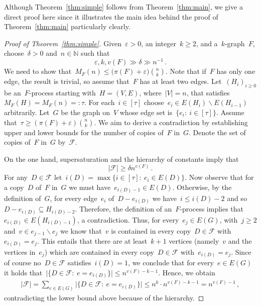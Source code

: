 \documentclass[reqno, 12pt]{amsart}
\numberwithin{equation}{section}
\numberwithin{figure}{section}
\let\setminus=\smallsetminus
\newcommand{\cF}{\mathcal{F}}
\theoremstyle{plain}
\theoremstyle{note}
\theoremstyle{remark}
\begin{document}
        Although Theorem~\ref{thm:simple} follows from Theorem~\ref{thm:main}, we give a direct proof here since it illustrates the main idea behind the proof of Theorem~\ref{thm:main} particularly clearly.
        \begin{proof}[Proof of Theorem~\ref{thm:simple}]
            Given~$\varepsilon>0$, an integer~$k\geq2$, and a~$k$-graph~$F$, choose~$\delta>0$ and~$n\in\mathds{N}$ such that $$\varepsilon,k,v(F)\gg\delta\gg n^{-1}\,.$$
            We need to show that~$M_F(n)\leq\big(\pi(F)+\varepsilon\big)\binom{n}{k}$.
            Note that if~$F$ has only one edge, the result is trivial, so assume that~$F$ has at least two edges.
            Let~$(H_i)_{i\geq0}$ be an~$F$-process starting with~$H=(V,E)$, where~$\vert V\vert=n$, that satisfies~$M_F(H)= M_F(n)=:\tau$.
            For each~$i\in[\tau]$ choose~$e_i\in E(H_i)\setminus E(H_{i-1})$ arbitrarily.
            Let~$G$ be the graph on~$V$ whose edge set is~$\{e_i:\:i\in[\tau]\}$.
            Assume that~$\tau\geq(\pi(F)+\varepsilon)\binom{n}{k}$.
            We aim to derive a contradiction by establishing upper and lower bounds for the number of copies of~$F$ in~$G$.
            Denote the set of copies of~$F$ in~$G$ by~$\cF$.
            
            On the one hand, supersaturation and the hierarchy of constants imply that $$\vert\cF\vert\geq\delta n^{v(F)}\,.$$
            For any~$D\in\cF$ let~$i(D)=\max\{i\in[\tau]:\:e_i\in E(D)\}$.
            Now observe that for a copy~$D$ of~$F$ in~$G$ we must have~$e_{i(D)-1}\in E(D)$.
            Otherwise, by the definition of~$G$, for every edge~$e_i$ of~$D-e_{i(D)}$ we have~$i\leq i(D)-2$ and so~$D-e_{i(D)}\subseteq H_{i(D)-2}$.
            Therefore, the definition of an~$F$-process implies that~$e_{i(D)}\in E(H_{i(D)-1})$, a contradiction.
            Thus, for every~$e_j\in E(G)$, with~$j\geq2$ and~$v\in e_{j-1}\setminus e_j$ we know that~$v$ is contained in every copy~$D\in\cF$ with~$e_{i(D)}=e_j$.
            This entails that there are at least~$k+1$ vertices (namely~$v$ and the vertices in~$e_j$) which are contained in every copy~$D\in\cF$ with~$e_{i(D)}=e_j$.
            Since of course no~$D\in\cF$ satisfies~$i(D)=1$, we conclude that for every~$e\in E(G)$ it holds that~$\vert\{D\in\cF:\:e=e_{i(D)}\}\vert\leq n^{v(F)-k-1}$.
            Hence, we obtain
            \begin{align*}
                \vert\cF\vert=\sum_{e\in E(G)}\vert\{D\in\cF:\:e=e_{i(D)}\}\vert\leq n^k\cdot n^{v(F)-k-1}=n^{v(F)-1}\,,
            \end{align*}
            contradicting the lower bound above because of the hierarchy.
        \end{proof}
        
\end{document}
